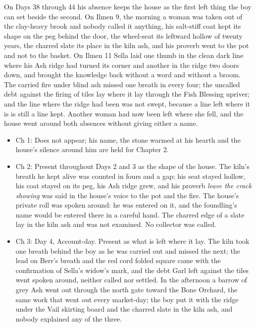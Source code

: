 \documentclass{design/chronicle}
\begin{document}
{On Days 38 through 44 his absence keeps the house as the first left thing the boy can set beside the second. On Ilmen 9, the morning a woman was taken out of the clay-heavy brook and nobody called it anything, his salt-stiff coat kept its shape on the peg behind the door, the wheel-seat its leftward hollow of twenty years, the charred slate its place in the kiln ash, and his proverb went to the pot and not to the basket. On Ilmen 11 Sella laid one thumb in the clean dark line where his Ash ridge had turned its corner and another in the ridge two doors down, and brought the knowledge back without a word and without a broom. The carried fire under blind ash missed one breath in every four; the uncalled debt against the firing of tiles lay where it lay through the Fish Blessing upriver; and the line where the ridge had been was not swept, because a line left where it is is still a line kept. Another woman had now been left where she fell, and the house went around both absences without giving either a name.

\begin{itemize}[leftmargin=1.4em,itemsep=1pt,topsep=3pt,parsep=0pt]

\item Ch 1: Does not appear; his name, the stone warmed at his hearth and the house’s silence around him are held for Chapter 2.

\item Ch 2: Present throughout Days 2 and 3 as the shape of the house. The kiln’s breath he kept alive was counted in fours and a gap; his seat stayed hollow, his coat stayed on its peg, his Ash ridge grew, and his proverb \emph{leave the crack showing} was said in the house’s voice to the pot and the fire. The house’s private roll was spoken around: he was entered on it, and the foundling’s name would be entered there in a careful hand. The charred edge of a slate lay in the kiln ash and was not examined. No collector was called.

\item Ch 3: Day 4, Account-day. Present as what is left where it lay. The kiln took one breath behind the boy as he was carried out and missed the next; the lead on Berr’s breath and the red cord folded square came with the confirmation of Sella’s widow’s mark, and the debt Garl left against the tiles went spoken around, neither called nor settled. In the afternoon a barrow of grey Ash went out through the north gate toward the Bone Orchard, the same work that went out every market-day; the boy put it with the ridge under the Vail skirting board and the charred slate in the kiln ash, and nobody explained any of the three.


\end{itemize}}
\end{document}
